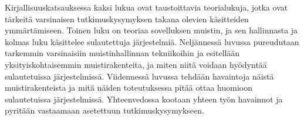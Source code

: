 Kirjallisuuskatsauksessa kaksi lukua ovat taustoittavia teorialukuja, jotka ovat tärkeitä varsinaisen tutkimuskysymyksen takana olevien käsitteiden ymmärtämiseen. Toinen luku on teoriaa sovelluksen muistin, ja sen hallinnasta ja kolmas luku käsittelee sulautettuja järjestelmiä. Neljännessä luvussa pureudutaan tarkemmin varsinaisiin muistinhallinnan tekniikoihin ja esitellään yksityiskohtaisemmin muistirakenteita, ja miten niitä voidaan hyödyntää sulautetuissa järjestelmissä. Viidennessä luvussa tehdään havaintoja näistä muistirakenteista ja mitä näiden toteutuksessa pitää ottaa huomioon sulautetuissa järjestelmissä. Yhteenvedossa kootaan yhteen työn havainnot ja pyritään vastaamaan asetettuun tutkimuskysymykseen.